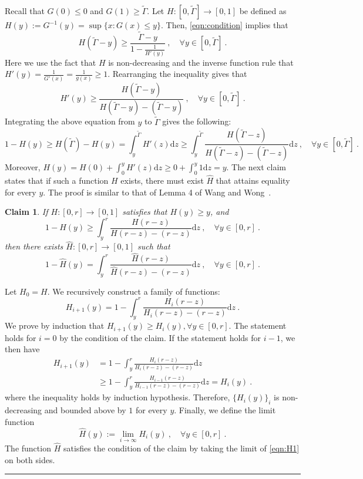 \documentclass[11pt,letterpaper]{article}
\newenvironment{proof}{{\bf Proof:  }}{\hfill\rule{2mm}{2mm}\vspace*{5pt}}
\newtheorem{claim}{Claim}[section]
\newcommand{\dd}[1]{\mathrm{d}#1}
\begin{document}
Recall that $G(0) \le 0$ and $G(1) \ge \tilde{\Gamma}$. Let $H:[0,\tilde{\Gamma}] \to [0,1]$ be defined as $H(y):=G^{-1}(y) = \sup\{x:G(x)\le y\}$. 
Then, \eqref{eqn:condition} implies that
\[
H(\tilde\Gamma-y) \ge \frac{\tilde\Gamma-y}{1-\frac{1}{H'(y)}}~, \quad \forall y \in [0,\tilde\Gamma]~.
\]
Here we use the fact that $H$ is non-decreasing and the inverse function rule that $H'(y)=\frac{1}{G'(x)}= \frac{1}{g(x)} \ge 1$. Rearranging the inequality gives that
\[
H'(y) \ge \frac{H(\tilde\Gamma- y)}{H(\tilde\Gamma - y) - (\tilde\Gamma - y)}~, \quad \forall y \in [0,\tilde\Gamma]~.
\]
Integrating the above equation from $y$ to $\tilde\Gamma$ gives the following:
\begin{equation}
\label{eqn:H}
1-H(y) \ge H(\tilde\Gamma) - H(y) =\int_y^{\tilde\Gamma} H'(z) \dd z \ge \int_y^{\tilde\Gamma} \frac{H(\tilde\Gamma- z)}{H(\tilde\Gamma - z) - (\tilde\Gamma - z)} \dd z~, \quad \forall y \in [0,\tilde\Gamma]~.
\end{equation}
Moreover, $H(y) = H(0) + \int_0^y H'(z) \dd z \ge 0 + \int_0^y 1 \dd z = y$.
The next claim states that if such a function $H$ exists, there must exist $\widehat{H}$ that attains equality for every $y$. 
The proof is similar to that of Lemma 4 of Wang and Wong~\cite{icalp/WangW15}.
\begin{claim}
If $H:[0,r] \to [0,1]$ satisfies that $H(y) \ge y$, and
\[
1-H(y) \ge \int_y^{r} \frac{H(r- z)}{H(r - z) - (r - z)} \dd z~, \quad \forall y \in [0,r]~.
\]
then there exists $\widehat{H}:[0,r] \to [0,1]$ such that
\[
1-\widehat{H}(y) = \int_y^{r} \frac{\widehat{H}(r-z)}{\widehat{H}(r-z)-(r-z)} \dd z~, \quad \forall y \in [0,r]~.
\]
\end{claim}
\begin{proof}
Let $H_0=H$. We recursively construct a family of functions: 
\begin{equation}
\label{eqn:H1}
H_{i+1}(y) = 1-\int_y^r \frac{H_i(r-z)}{H_i(r-z)-(r-z)} \dd z~.
\end{equation}
We prove by induction that $H_{i+1}(y) \ge H_i(y), \forall y \in [0,r]$. The statement holds for $i=0$ by the condition of the claim. If the statement holds for $i-1$, we then have
\begin{align*}
H_{i+1}(y) & = 1-\int_y^r \frac{H_i(r-z)}{H_i(r-z)-(r-z)} \dd z \\
& \ge 1-\int_y^r \frac{H_{i-1}(r-z)}{H_{i-1}(r-z)-(r-z)} \dd z = H_i(y)~.
\end{align*}
where the inequality holds by induction hypothesis. Therefore, $\{H_i(y)\}_i$ is non-decreasing and bounded above by $1$ for every $y$. Finally, we define the limit function 
\[
\widehat{H}(y) := \lim_{i \to \infty} H_i(y)~, \quad \forall y \in[0,r]~.
\]
The function $\widehat{H}$ satisfies the condition of the claim by taking the limit of \eqref{eqn:H1} on both sides.
\end{proof}
\end{document}
